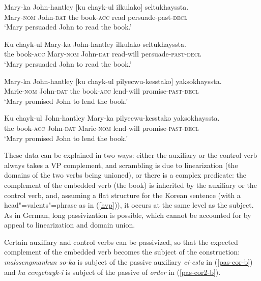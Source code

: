 \documentclass[output=paper]{langsci/langscibook}
\begin{document}
	
	\begin{exe}
		\ex  \label{control-cor}
		
		\begin{xlist} 
			
			\ex \label{control-cor-a}
			\gll Mary-ka  John-hantley [ku chayk-ul  ilkulako] seltukhayssta.\\
			Mary-\textsc{nom}   John-\textsc{dat} the book-\textsc{acc} 	read	persuade-past-\textsc{decl}\\
			\glt `Mary persuaded John to read the book.'
			
			\ex \label{control-cor-b}
			Ku chayk-ul  Mary-ka John-hantley ilkulako seltukhayssta.\\
			the book-\textsc{acc} Mary-\textsc{nom}   John-\textsc{dat} 	read-will persuade-\textsc{past-decl}\\
			\glt `Mary persuaded John to read the book.'
			
			
			\ex \label{control-cor-c}
			\gll Mary-ka	 John-hantley 	[ku chayk-ul 	pilyecwu-kesstako] 	yaksokhayssta.\\
			Marie-\textsc{nom}  John-\textsc{dat}	 the book-\textsc{acc} lend-will	promise-\textsc{past-decl}\\
			\glt `Mary promised John to lend the book.'
			
			\ex \label{control-cor-d}
			\gll Ku chayk-ul John-hantley Mary-ka pilyecwu-kesstako	yaksokhayssta.\\
			   the book-\textsc{acc} John-\textsc{dat} Marie-\textsc{nom} lend-will	promise-\textsc{past-decl}\\
			   \glt `Mary promised John to lend the book.'
			
			
		\end{xlist}
	\end{exe}
	
	These data can be explained in two ways: either the auxiliary or the control verb always takes a VP complement, and scrambling is due to linearization (the domains of the two verbs being unioned), or there is a complex predicate: the complement of the embedded verb (the book) is inherited by the auxiliary or the control verb, and, assuming a flat structure for the Korean sentence (with a head"=valents"=phrase as in (\ref{hvp})), it occurs at the same level as the subject. As in German, long passivization is possible, which cannot be accounted for by appeal to linearization and domain union.
	
	Certain auxiliary and control verbs can be passivized, so that the expected complement of the embedded verb becomes the subject of the construction: \textit{malssengmanhun so-ka} is subject of the passive auxiliary \textit{ci-esta} in (\ref{pas-cor-b}) and \textit{ku cengchayk-i} is subject of the passive of \textit{order} in (\ref{pas-cor2-b}).
	
\end{document}
